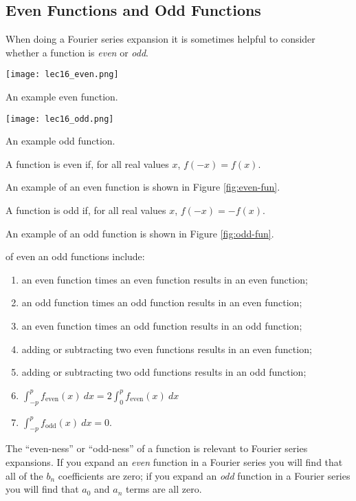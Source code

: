 \subsection{Even Functions and Odd Functions}  
When doing a Fourier series expansion it is sometimes helpful to consider whether a function is \emph{even} or \emph{odd}.  
\begin{marginfigure}
\texttt{[image: lec16\_even.png]}
\caption{An example even function.}
\label{fig:even-fun}
\end{marginfigure}
\begin{marginfigure}
\texttt{[image: lec16\_odd.png]}
\caption{An example odd function.}
\label{fig:odd-fun}
\end{marginfigure}
\begin{definition}
A function is even if, for all real values $x$, $f(-x) = f(x)$.  
\end{definition}
An example of an even function is shown in Figure \ref{fig:even-fun}.
\begin{definition}
A function is odd if, for all real values $x$, $f(-x) = -f(x)$.
\end{definition}
An example of an odd function is shown in Figure \ref{fig:odd-fun}.

 of even an odd functions include:
\begin{enumerate}
\item an even function times an even function results in an even function;
\item an odd function times an odd function results in an even function;
\item an even function times an odd function results in an odd function;
\item adding or subtracting two even functions results in an even function;
\item adding or subtracting two odd functions results in an odd function;
\item $\int_{-p}^{p} f_{\text{even}}(x) \ dx = 2\int_{0}^{p} f_{\text{even}}(x) \ dx$
\item $\int_{-p}^{p} f_{\text{odd}}(x) \ dx = 0$.
\end{enumerate}

The ``even-ness'' or ``odd-ness'' of a function is relevant to Fourier series expansions.  If you expand an \emph{even} function in a Fourier series you will find that all of the $b_n$ coefficients are zero;  if you expand an \emph{odd} function in a Fourier series you will find that $a_0$ and $a_n$ terms are all zero.

